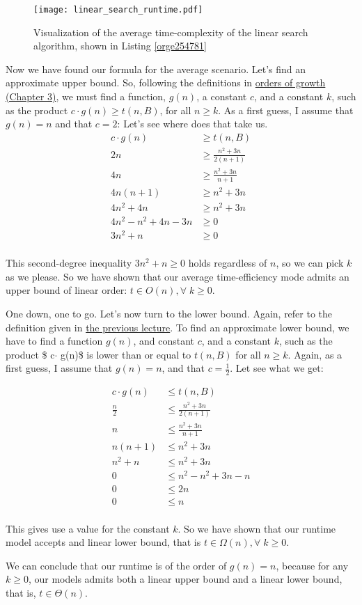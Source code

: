 \documentclass[11pt]{article}
\begin{document}
\begin{figure}[htbp]
\centering
\texttt{[image: linear\_search\_runtime.pdf]}
\caption{\label{fig:org564412c}Visualization of the average time-complexity of the linear search algorithm, shown in Listing \ref{orge254781}}
\end{figure}

Now we have found our formula for the average scenario. Let's find
an approximate upper bound. So, following the definitions in
\href{orders\_of\_growth.org}{orders of growth (Chapter 3)}, we must find a function, \(g(n)\), a
constant \(c\), and a constant \(k\), such as the product \(c \cdot
  g(n) \geq t(n, B)\), for all \(n \geq k\). As a first guess, I assume
that \(g(n) = n\) and that \(c=2\): Let's see where does that take us.
\begin{align*}
   c \cdot g(n) & \geq t(n, B) \\
   2n & \geq \frac{n^2 + 3n}{2(n+1)} \\
   4n & \geq \frac{n^2 +3n}{n+1} \\
   4n (n+1) & \geq n^2 +3n \\
   4n^2 + 4n & \geq n^2 +3n \\
   4n^2 - n^2 + 4n - 3n & \geq 0 \\
   3n^2 + n & \geq 0 \\
\end{align*}

This second-degree inequality \(3n^2 + n \geq 0\) holds
regardless of \(n\), so we can pick \(k\) as we please. So we have
shown that our average time-efficiency mode admits an upper bound
of linear order: \(t \in O(n), \forall \; k \geq 0\).

One down, one to go. Let's now turn to the lower bound. Again,
refer to the definition given in \href{orders\_of\_growth.org}{the previous lecture}. To find an
approximate lower bound, we have to find a function \(g(n)\), and
constant \(c\), and a constant \(k\), such as the product \$ c\(\cdot\)
g(n)\$ is lower than or equal to \(t(n, B)\) for all \(n \geq
  k\). Again, as a first guess, I assume that \(g(n) = n\), and that
\(c=\frac{1}{2}\). Let see what we get:

\begin{align*}
   c \cdot g(n) & \leq t(n, B) \\
   \frac{n}{2} & \leq \frac{n^2 + 3n}{2(n+1)} \\
   n & \leq \frac{n^2 +3n}{n+1} \\
   n (n+1) & \leq n^2 +3n \\
   n^2 + n & \leq n^2 + 3n \\
   0 & \leq n^2 - n^2 + 3n - n   \\
   0 & \leq 2n \\
   0 & \leq n \\
\end{align*}

This gives use a value for the constant \(k\). So we have shown that
our runtime model accepts and linear lower bound, that is \(t \in
  \Omega(n), \forall \; k \geq 0\).

We can conclude that our runtime is of the order of \(g(n) = n\),
because for any \(k \geq 0\), our models admits both a linear upper
bound and a linear lower bound, that is, \(t \in \Theta(n)\).
\end{document}
